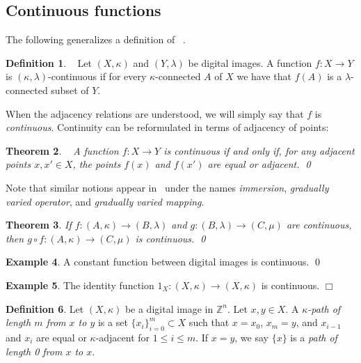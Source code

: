 \documentclass{article}
\theoremstyle{plain}
\newtheorem{thm}{Theorem}
\theoremstyle{definition}
\newtheorem{definition}[thm]{Definition}
\newtheorem{exl}[thm]{Example}
\numberwithin{thm}{section}
\def\Z{{\mathbb Z}}
\begin{document}
\subsection{Continuous functions}
The following generalizes a definition of
~\cite{Rosenfeld}.

\begin{definition}
\label{continuous}
{\rm ~\cite{Boxer99}}
Let $(X,\kappa)$ and $(Y,\lambda)$ be digital images. A function
$f: X \rightarrow Y$ is $(\kappa,\lambda)$-continuous if for
every $\kappa$-connected $A$ of $X$ we have that
$f(A)$ is a $\lambda$-connected subset of $Y$. 
\end{definition}

When the adjacency relations are understood, we will simply say that $f$ is \emph{continuous}. Continuity can be reformulated in terms of adjacency of points:
\begin{thm}
\label{cont-by-adj}
{\rm ~\cite{Rosenfeld,Boxer99}}
A function $f:X\to Y$ is continuous if and only if, for any adjacent points $x,x'\in X$, the points $f(x)$ and $f(x')$ are equal or adjacent. \qed
\end{thm}

Note that similar notions appear
in~\cite{Chen94,Chen04} under the names
{\em immersion}, {\em gradually varied operator},
and {\em gradually varied mapping}.

\begin{thm}
\label{composition}
\rm{\cite{Boxer94,Boxer99}}
If $f: (A,\kappa) \to (B,\lambda)$ and $g: (B,\lambda) \to (C, \mu)$ are
continuous, then $g \circ f: (A,\kappa) \to (C, \mu)$ is continuous. \qed
\end{thm}

\begin{exl}
\rm{\cite{Rosenfeld}}
\label{const-exl}
A constant function between digital images is continuous. \qed
\end{exl}

\begin{exl}
\label{id-exl}
The identity function $1_X: (X, \kappa) \to (X, \kappa)$ is continuous. $\Box$
\end{exl}

\begin{definition}
Let $(X,\kappa)$ be a digital image
in $\Z^n$.
Let $x,y \in X$. A {\em 
$\kappa$-path of length $m$ from $x$ to $y$}
is a set $\{x_i\}_{i=0}^m \subset X$
such that $x=x_0$, $x_m=y$, and
$x_{i-1}$ and $x_i$ are equal or $\kappa$-adjacent for $1 \leq i \leq m$. If $x=y$, we say $\{x\}$ is a
{\em path of length 0 from $x$ to $x$}.
\end{definition}
\end{document}
